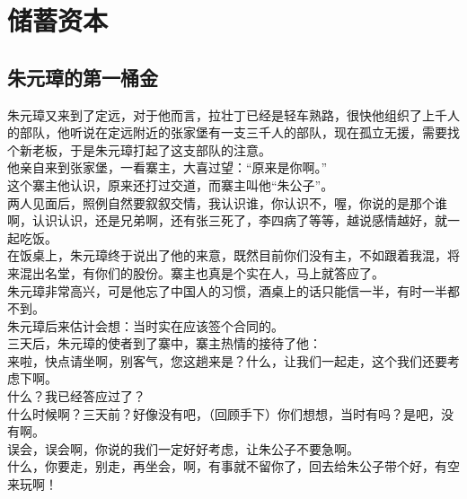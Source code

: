 \section{储蓄资本}
\ifnum{}
	\begin{multicols}{\theparacolNo}
\fi
\subsection{朱元璋的第一桶金}
朱元璋又来到了定远，对于他而言，拉壮丁已经是轻车熟路，很快他组织了上千人的部队，他听说在定远附近的张家堡有一支三千人的部队，现在孤立无援，需要找个新老板，于是朱元璋打起了这支部队的注意。\\

他亲自来到张家堡，一看寨主，大喜过望：“原来是你啊。”\\

这个寨主他认识，原来还打过交道，而寨主叫他“朱公子”。\\

两人见面后，照例自然要叙叙交情，我认识谁，你认识不，喔，你说的是那个谁啊，认识认识，还是兄弟啊，还有张三死了，李四病了等等，越说感情越好，就一起吃饭。\\

在饭桌上，朱元璋终于说出了他的来意，既然目前你们没有主，不如跟着我混，将来混出名堂，有你们的股份。寨主也真是个实在人，马上就答应了。\\

朱元璋非常高兴，可是他忘了中国人的习惯，酒桌上的话只能信一半，有时一半都不到。\\

朱元璋后来估计会想：当时实在应该签个合同的。\\

三天后，朱元璋的使者到了寨中，寨主热情的接待了他：\\

来啦，快点请坐啊，别客气，您这趟来是？什么，让我们一起走，这个我们还要考虑下啊。\\

什么？我已经答应过了？\\

什么时候啊？三天前？好像没有吧，（回顾手下）你们想想，当时有吗？是吧，没有啊。\\

误会，误会啊，你说的我们一定好好考虑，让朱公子不要急啊。\\

什么，你要走，别走，再坐会，啊，有事就不留你了，回去给朱公子带个好，有空来玩啊！\\


\end{multicols}
